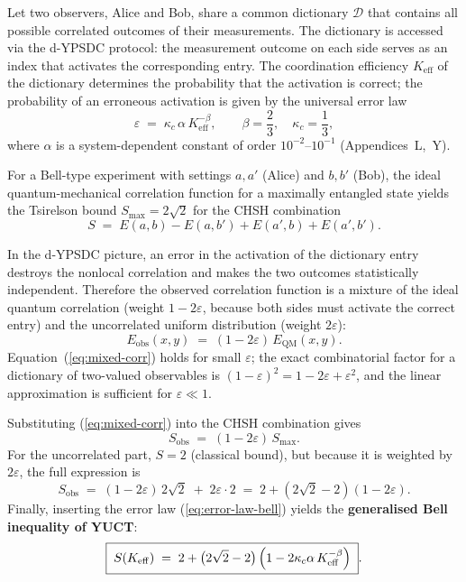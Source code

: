 \documentclass[12pt,a4paper]{article}
\theoremstyle{remark}
\begin{document}
	Let two observers, Alice and Bob, share a common dictionary $\mathcal{D}$ that contains all possible
	correlated outcomes of their measurements.  The dictionary is accessed via the d-YPSDC protocol:
	the measurement outcome on each side serves as an index that activates the corresponding entry.
	The coordination efficiency $K_{\mathrm{eff}}$ of the dictionary determines the probability that
	the activation is correct; the probability of an erroneous activation is given by the universal
	error law
	\begin{equation}
		\varepsilon \;=\; \kappa_c\,\alpha\,K_{\mathrm{eff}}^{-\beta},
		\qquad \beta = \frac{2}{3},\quad \kappa_c = \frac{1}{3},
		\label{eq:error-law-bell}
	\end{equation}
	where $\alpha$ is a system-dependent constant of order $10^{-2}$--$10^{-1}$ (Appendices~L,~Y).
	
	For a Bell-type experiment with settings $a,a'$ (Alice) and $b,b'$ (Bob), the ideal quantum-mechanical
	correlation function for a maximally entangled state yields the Tsirelson bound
	$S_{\max}=2\sqrt{2}$ for the CHSH combination
	\[
	S \;=\; E(a,b)-E(a,b')+E(a',b)+E(a',b').
	\]
	
	In the d-YPSDC picture, an error in the activation of the dictionary entry destroys the nonlocal
	correlation and makes the two outcomes statistically independent.  Therefore the observed
	correlation function is a mixture of the ideal quantum correlation (weight $1-2\varepsilon$,
	because both sides must activate the correct entry) and the uncorrelated uniform distribution
	(weight $2\varepsilon$):
	\begin{equation}
		E_{\mathrm{obs}}(x,y) \;=\; (1-2\varepsilon)\,E_{\mathrm{QM}}(x,y).
		\label{eq:mixed-corr}
	\end{equation}
	Equation~(\ref{eq:mixed-corr}) holds for small $\varepsilon$; the exact combinatorial factor for
	a dictionary of two-valued observables is $(1-\varepsilon)^2 = 1-2\varepsilon + \varepsilon^2$,
	and the linear approximation is sufficient for $\varepsilon\ll1$.
	
	Substituting (\ref{eq:mixed-corr}) into the CHSH combination gives
	\[
	S_{\mathrm{obs}} \;=\; (1-2\varepsilon)\,S_{\max}.
	\]
	For the uncorrelated part, $S=2$ (classical bound), but because it is weighted by $2\varepsilon$,
	the full expression is
	\begin{equation}
		S_{\mathrm{obs}} \;=\; (1-2\varepsilon)\,2\sqrt{2} \;+\; 2\varepsilon\cdot 2
		\;=\; 2 + (2\sqrt{2}-2)(1-2\varepsilon).
		\label{eq:Sobs-intermediate}
	\end{equation}
	Finally, inserting the error law (\ref{eq:error-law-bell}) yields the
	\textbf{generalised Bell inequality of YUCT}:
	\begin{equation}
		\boxed{\;
			S(K_{\mathrm{eff}}) \;=\; 2 + \bigl(2\sqrt{2}-2\bigr)\,
			\Bigl(1 - 2\kappa_c\alpha\,K_{\mathrm{eff}}^{-\beta}\Bigr)
			\;}.
		\label{eq:bell-generalised}
	\end{equation}
	
\end{document}
